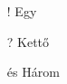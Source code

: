 \documentclass{article}
\begin{document}
\begin{enumerate}
  \item [!]Egy
  \item [?]Kettő
  \item [és]Három
\end{enumerate}
\end{document}
